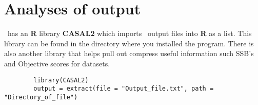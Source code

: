 \section{Analyses of output}\label{Sec:output}

\CNAME\ has an \textbf{R} library \textbf{CASAL2} which imports \CNAME\ output files into \textbf{R} as a list. This library can be found in the directory where you installed the program. There is also another library that helps pull out compress useful information such SSB's and Objective scores for datasets. 
{\small{\begin{verbatim}
		library(CASAL2)
		output = extract(file = "Output_file.txt", path = "Directory_of_file")
		\end{verbatim}}}
